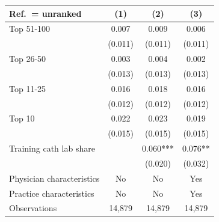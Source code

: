 \small{
\begin{tabular}{lccc}
\toprule
Ref.\ = unranked & (1) & (2) & (3) \\
\midrule
Top 51-100 & 0.007 & 0.009 & 0.006 \\
 & (0.011) & (0.011) & (0.011) \\
Top 26-50 & 0.003 & 0.004 & 0.002 \\
 & (0.013) & (0.013) & (0.013) \\
Top 11-25 & 0.016 & 0.018 & 0.016 \\
 & (0.012) & (0.012) & (0.012) \\
Top 10 & 0.022 & 0.023 & 0.019 \\
 & (0.015) & (0.015) & (0.015) \\
Training cath lab share &   & 0.060*** & 0.076** \\
 &   & (0.020) & (0.032) \\
\midrule
Physician characteristics & No & No & Yes \\
Practice characteristics & No & No & Yes \\
Observations & 14,879 & 14,879 & 14,879 \\
\bottomrule
\end{tabular}}